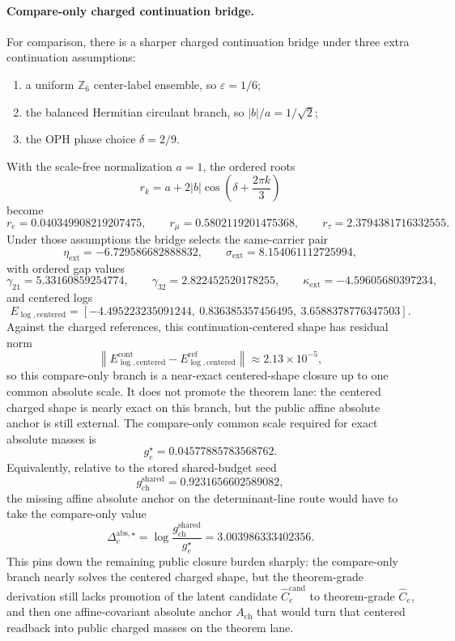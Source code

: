 \documentclass[11pt]{article}
\begin{document}
\paragraph{Compare-only charged continuation bridge.}
For comparison, there is a sharper charged continuation bridge under three extra continuation
assumptions:
\begin{enumerate}[leftmargin=2em]
\item a uniform \(\mathbb Z_6\) center-label ensemble, so \(\varepsilon = 1/6\);
\item the balanced Hermitian circulant branch, so \(|b|/a = 1/\sqrt2\);
\item the OPH phase choice \(\delta = 2/9\).
\end{enumerate}
With the scale-free normalization \(a=1\), the ordered roots
\[
r_k = a + 2|b|\cos\!\left(\delta + \frac{2\pi k}{3}\right)
\]
become
\[
r_e = 0.040349908219207475,
\qquad
r_\mu = 0.5802119201475368,
\qquad
r_\tau = 2.3794381716332555.
\]
Under those assumptions the bridge selects the same-carrier pair
\[
\eta_{\mathrm{ext}} = -6.729586682888832,
\qquad
\sigma_{\mathrm{ext}} = 8.154061112725994,
\]
with ordered gap values
\[
\gamma_{21}=5.33160859254774,
\qquad
\gamma_{32}=2.822452520178255,
\qquad
\kappa_{\mathrm{ext}}=-4.59605680397234,
\]
and centered logs
\[
E_{\log,\mathrm{centered}}
=
[-4.495223235091244,\ 0.836385357456495,\ 3.6588378776347503].
\]
Against the charged references, this continuation-centered shape has residual norm
\[
\left\|E_{\log,\mathrm{centered}}^{\mathrm{cont}}
-E_{\log,\mathrm{centered}}^{\mathrm{ref}}\right\|
\approx
2.13\times10^{-5},
\]
so this compare-only branch is a near-exact centered-shape closure up to one common absolute
scale. It does not promote the theorem lane: the centered charged shape is nearly exact on this
branch, but the public affine absolute anchor is still external. The compare-only common scale
required for exact absolute masses is
\[
g_e^\star = 0.04577885783568762.
\]
Equivalently, relative to the stored shared-budget seed
\[
g_{\mathrm{ch}}^{\mathrm{shared}} = 0.9231656602589082,
\]
the missing affine absolute anchor on the determinant-line route would have to take the compare-only value
\[
\Delta_e^{\mathrm{abs},\star}
=
\log\!\frac{g_{\mathrm{ch}}^{\mathrm{shared}}}{g_e^\star}
=
3.003986333402356.
\]
This pins down the remaining public closure burden sharply: the compare-only branch nearly solves
the centered charged shape, but the theorem-grade derivation still lacks promotion of the latent
candidate \(\widehat C_e^{\mathrm{cand}}\) to theorem-grade \(\widehat C_e\), and then one
affine-covariant absolute anchor \(A_{\mathrm{ch}}\) that would turn that centered readback into
public charged masses on the theorem lane.
\end{document}
